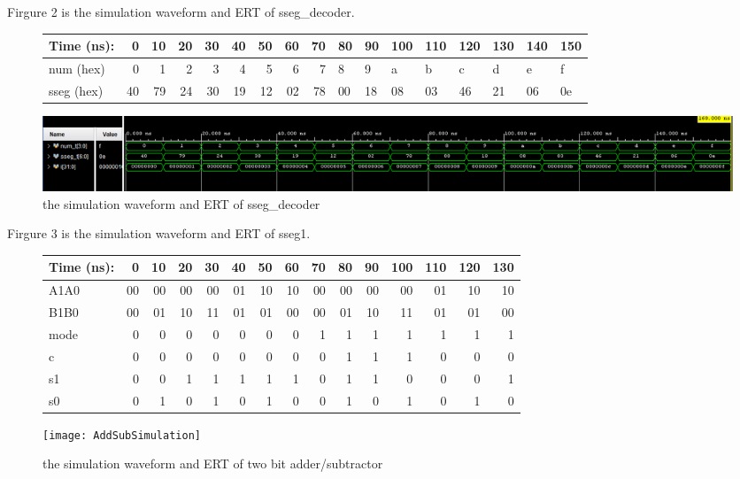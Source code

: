 \documentclass[11pt]{article}
\begin{document}
	Firgure 2 is the simulation waveform and ERT of sseg_decoder. \\
	\begin{figure}[ht]\centering
		\begin{tabular}{l|rrrr|rrrr}
			Time (ns): & 0 & 10 & 20 & 30 & 40 & 50 & 60 & 70 & 80 & 90 & 100 & 110 & 120 & 130 & 140 & 150 \\
			\midrule
			num (hex) & 0 & 1 & 2 & 3 & 4 & 5 & 6 & 7 & 8 & 9 & a & b & c & d & e & f \\
			\midrule
			sseg (hex) & 40 & 79 & 24 & 30 & 19 & 12 & 02 & 78 & 00 & 18 & 08 & 03 & 46 & 21 & 06 & 0e \\
			\bottomrule
		\end{tabular}\medskip
		
		\includegraphics[width=1\textwidth]{sseg_decoder_simulation}
		\caption{the simulation waveform and ERT of sseg_decoder}
		\label{fig:sseg_decoder_simulation}
	\end{figure}
	
	Firgure 3 is the simulation waveform and ERT of sseg1. \\
	\begin{figure}[ht]\centering
		\begin{tabular}{l|rrrr|rrrr|rrrr|rr}
			Time (ns): & 0 & 10 & 20 & 30 & 40 & 50 & 60 & 70 & 80 & 90 & 100 & 110 & 120 & 130 \\
			\midrule
			A1A0 & 00 & 00 & 00 & 00 & 01 & 10 & 10 & 00 & 00 & 00 & 00 & 01 & 10 & 10 \\
			B1B0 & 00 & 01 & 10 & 11 & 01 & 01 & 00 & 00 & 01 & 10 & 11 & 01 & 01 & 00 \\
			mode & 0 & 0 & 0 & 0 & 0 & 0 & 0 & 1 & 1 & 1 & 1 & 1 & 1 & 1 \\
			\midrule
			c & 0 & 0 & 0 & 0 & 0 & 0 & 0 & 0 & 1 & 1 & 1 & 0 & 0 & 0 \\
			s1 & 0 & 0 & 1 & 1 & 1 & 1 & 1 & 0 & 1 & 1 & 0 & 0 & 0 & 1 \\
			s0 & 0 & 1 & 0 & 1 & 0 & 1 & 0 & 0 & 1 & 0 & 1 & 0 & 1 & 0 \\
			\bottomrule
		\end{tabular}\medskip
		
		\texttt{[image: AddSubSimulation]}
		\caption{the simulation waveform and ERT of two bit adder/subtractor}
		\label{fig:AddSubSimulation}
	\end{figure}
\end{document}
